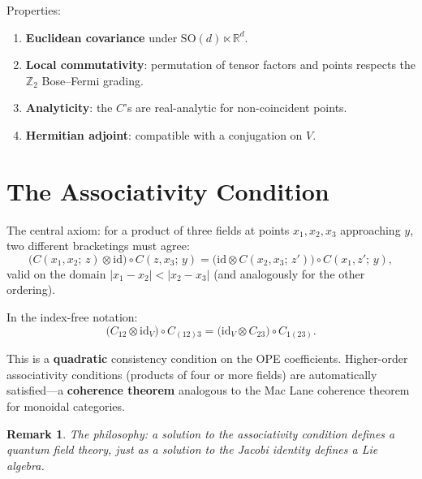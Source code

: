 \documentclass[11pt,a4paper]{article}
\newtheorem{remark}{Remark}[section]
\begin{document}
Properties:
\begin{enumerate}[nosep]
  \item \textbf{Euclidean covariance} under $\mathrm{SO}(d) \ltimes \mathbb{R}^d$.
  \item \textbf{Local commutativity}: permutation of tensor factors and points
        respects the $\mathbb{Z}_2$ Bose--Fermi grading.
  \item \textbf{Analyticity}: the $C$'s are real-analytic for non-coincident points.
  \item \textbf{Hermitian adjoint}: compatible with a conjugation on $V$.
\end{enumerate}

\section{The Associativity Condition}

The central axiom: for a product of three fields at points $x_1, x_2, x_3$
approaching $y$, two different bracketings must agree:
\begin{equation}
  \bigl(C(x_1,x_2;\,z) \otimes \mathrm{id}\bigr) \circ C(z,x_3;\,y)
  = \bigl(\mathrm{id} \otimes C(x_2,x_3;\,z')\bigr) \circ C(x_1,z';\,y),
\end{equation}
valid on the domain $|x_1 - x_2| < |x_2 - x_3|$ (and analogously for
the other ordering).

In the index-free notation:
\begin{equation}
  \bigl(C_{12} \otimes \mathrm{id}_V\bigr) \circ C_{(12)3}
  = \bigl(\mathrm{id}_V \otimes C_{23}\bigr) \circ C_{1(23)}.
\end{equation}

This is a \textbf{quadratic} consistency condition on the OPE coefficients.
Higher-order associativity conditions (products of four or more fields) are
automatically satisfied---a \textbf{coherence theorem} analogous to the
Mac Lane coherence theorem for monoidal categories.

\begin{remark}
The philosophy: \emph{a solution to the associativity condition defines
a quantum field theory}, just as a solution to the Jacobi identity
defines a Lie algebra.
\end{remark}

\end{document}
